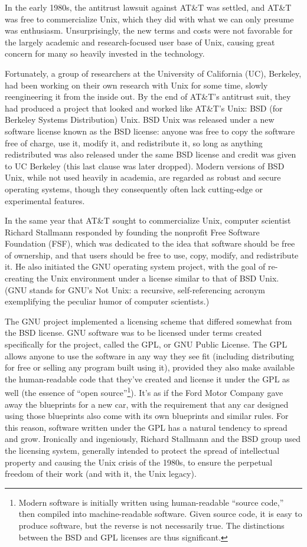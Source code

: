 \documentclass[
]{memoir}
\begin{document}
In the early 1980s, the antitrust lawsuit against AT\&T was settled, and AT\&T was free to commercialize Unix, which they did with what we can only presume was enthusiasm. Unsurprisingly, the new terms and costs were not favorable for the largely academic and research-focused user base of Unix, causing great concern for many so heavily invested in the technology.

Fortunately, a group of researchers at the University of California (UC), Berkeley, had been working on their own research with Unix for some time, slowly reengineering it from the inside out. By the end of AT\&T's antitrust suit, they had produced a project that looked and worked like AT\&T's Unix: BSD (for Berkeley Systems Distribution) Unix. BSD Unix was released under a new software license known as the BSD license: anyone was free to copy the software free of charge, use it, modify it, and redistribute it, so long as anything redistributed was also released under the same BSD license and credit was given to UC Berkeley (this last clause was later dropped). Modern versions of BSD Unix, while not used heavily in academia, are regarded as robust and secure operating systems, though they consequently often lack cutting-edge or experimental features.

In the same year that AT\&T sought to commercialize Unix, computer scientist Richard Stallmann responded by founding the nonprofit Free Software Foundation (FSF), which was dedicated to the idea that software should be free of ownership, and that users should be free to use, copy, modify, and redistribute it. He also initiated the GNU operating system project, with the goal of re-creating the Unix environment under a license similar to that of BSD Unix. (GNU stands for GNU's Not Unix: a recursive, self-referencing acronym exemplifying the peculiar humor of computer scientists.)

The GNU project implemented a licensing scheme that differed somewhat from the BSD license. GNU software was to be licensed under terms created specifically for the project, called the GPL, or GNU Public License. The GPL allows anyone to use the software in any way they see fit (including distributing for free or selling any program built using it), provided they also make available the human-readable code that they've created and license it under the GPL as well (the essence of \enquote{open source}\footnote{Modern software is initially written using human-readable \enquote{source code,} then compiled into machine-readable software. Given source code, it is easy to produce software, but the reverse is not necessarily true. The distinctions between the BSD and GPL licenses are thus significant.}). It's as if the Ford Motor Company gave away the blueprints for a new car, with the requirement that any car designed using those blueprints also come with its own blueprints and similar rules. For this reason, software written under the GPL has a natural tendency to spread and grow. Ironically and ingeniously, Richard Stallmann and the BSD group used the licensing system, generally intended to protect the spread of intellectual property and causing the Unix crisis of the 1980s, to ensure the perpetual freedom of their work (and with it, the Unix legacy).
\end{document}
